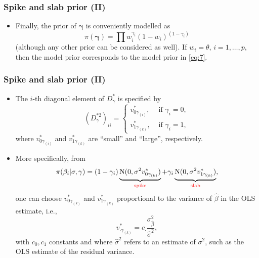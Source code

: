 \documentclass[xcolor=table,10pt]{beamer}
\begin{document}
\begin{frame}
  \frametitle{Spike and slab prior (II)}
  \begin{itemize}
  \item Finally, the prior of $\bm\gamma$ is conveniently modelled as
    \begin{equation}
      \label{eq:6}
      \pi(\bm \gamma) = \prod w_i^{\gamma_i} (1-w_i)^{(1-\gamma_i)}
    \end{equation}
    (although any other prior can be considered as well). If
    $w_i=\theta$, $i=1,\ldots, p$, then the model prior corresponds to
    the model prior in \eqref{eq:7}.
  \end{itemize}
\end{frame}

\begin{frame}
  \frametitle{Spike and slab prior (II)}
  \begin{itemize}
\item The $i$-th diagonal element of $D^\ast_\gamma$ is specified by  
\begin{equation*}
(D_{\gamma}^{\ast2})_{ii} =
\begin{cases}
  v_{0\gamma_{(i)}}^\ast, &\text{ if } \gamma_i=0,\\
  v_{1\gamma_{(k)}}^\ast, &\text{ if } \gamma_i=1,
\end{cases}
\end{equation*}
where $v_{0\gamma_{(i)}}^\ast$ and $ v_{1\gamma_{(k)}}^\ast$ are ``small''
and ``large'', respectively.
\item More specifically, from
\begin{equation*}
  \pi (\beta_i|\sigma, \gamma) =(1-\gamma_i) \underbrace{{\rm N}(0,\sigma^2
  v_{0\gamma_{(k)}}^\ast)}_{\text{\textcolor{red}{spike}}} + \gamma_i
\underbrace{{\rm N} (0,  \sigma^2
  v_{1\gamma_{(k)}}^\ast)}_{\text{\textcolor{red}{slab}}}, 
\end{equation*}
one can choose  $v_{0\gamma_{(k)}}^\ast$ and $ v_{1\gamma_{(k)}}^\ast$
proportional to the variance of $\hat\beta$ in the OLS estimate, i.e.,
\begin{equation*}
   v_{\cdot\gamma_{(k)}}^\ast = c_\cdot \frac{\sigma^2_{\hat\beta}}{\hat\sigma^2},
 \end{equation*}
with $c_0, c_1$ constants and where $\hat\sigma^2$ refers to an
estimate of $\sigma^2$, such as the OLS estimate of the residual
variance.
\end{itemize}
\end{frame}
\end{document}
